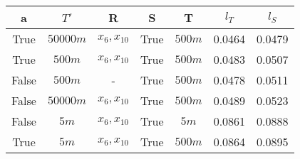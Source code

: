 \begin{tabular}{| c c | c c c | c c |}
\hline
a & $T'$ & R & S & T & $l_T$ & $l_S$ \\
\hline
True & $50000m$ & $x_{6}, x_{10}$ & True & $500m$ & 0.0464 & 0.0479 \\
True & $500m$ & $x_{6}, x_{10}$ & True & $500m$ & 0.0483 & 0.0507 \\
False & $500m$ & - & True & $500m$ & 0.0478 & 0.0511 \\
False & $50000m$ & $x_{6}, x_{10}$ & True & $500m$ & 0.0489 & 0.0523 \\
False & $5m$ & $x_{6}, x_{10}$ & True & $5m$ & 0.0861 & 0.0888 \\
True & $5m$ & $x_{6}, x_{10}$ & True & $500m$ & 0.0864 & 0.0895 \\
\hline
\end{tabular}
